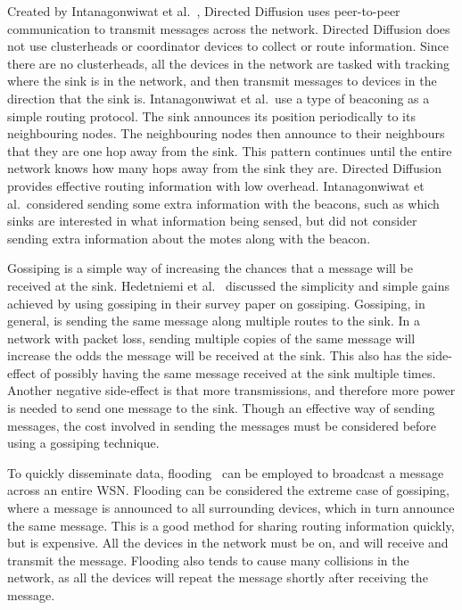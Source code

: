 Created by Intanagonwiwat et al.~\cite{directedDiffusion, nextCentury}, Directed Diffusion 
uses peer-to-peer communication to transmit messages across the network. Directed Diffusion 
does not use clusterheads or coordinator devices to collect or route information. Since 
there are no clusterheads, all the devices in the network are tasked with 
tracking where the sink is in the network, and then transmit messages to devices in the direction
that the sink is. Intanagonwiwat et al.\ use a type of beaconing as a simple routing protocol. The
sink announces its position periodically to its neighbouring nodes. The neighbouring nodes then announce
to their neighbours that they are one hop away from the sink. This pattern continues until the entire network
knows how many hops away from the sink they are.  Directed Diffusion provides effective routing 
information with low overhead. Intanagonwiwat et al.\  considered sending some extra information with the beacons,
such as which sinks are interested in what information being sensed, but did not consider sending 
extra information about the motes along with the beacon.

Gossiping is a simple way of 
increasing the chances that a message will be received at the sink. Hedetniemi et al.~\cite{gossiping} discussed
the simplicity and simple gains achieved by using gossiping in their survey paper on gossiping.
Gossiping, in general, is sending the same message along multiple routes 
to the sink. In a network with packet loss, sending multiple copies of the same message will increase the odds 
the message will be received at the sink. This also has the side-effect of possibly having the same message received at the 
sink multiple times. Another negative side-effect is that more transmissions, and therefore more power is needed to 
send one message to the sink. Though an effective way of sending messages, the cost involved in sending the messages
must be considered before using a gossiping technique.

To quickly disseminate data, flooding~\cite{wsnSurvey} can be employed to broadcast a message across an entire WSN.
Flooding can be considered the extreme case of gossiping, where a message is announced to all surrounding 
devices, which in turn announce the same message. This is a good method for sharing routing information
quickly, but is expensive. All the devices in the network must be on, and will receive and transmit the message.
Flooding also tends to cause many collisions in the network, as all the devices will repeat the message shortly after 
receiving the message.



